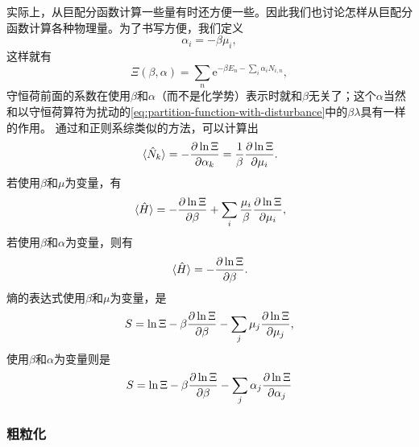 \documentclass[hyperref, UTF8, a4paper]{ctexart}
\newcommand*{\ee}{\mathrm{e}}
\begin{document}
实际上，从巨配分函数计算一些量有时还方便一些。因此我们也讨论怎样从巨配分函数计算各种物理量。为了书写方便，我们定义
\begin{equation}
    \alpha_i = - \beta \mu_i,
\end{equation}
这样就有
\begin{equation}
    \Xi(\beta, \alpha) = \sum_n \ee^{-\beta E_n - \sum_i \alpha_i N_{i,n}},
\end{equation}
守恒荷前面的系数在使用$\beta$和$\alpha$（而不是化学势）表示时就和$\beta$无关了；这个$\alpha$当然和以守恒荷算符为扰动的\eqref{eq:partition-function-with-disturbance}中的$\beta\lambda$具有一样的作用。
通过和正则系综类似的方法，可以计算出
\begin{equation}
    \expval*{\hat{N}_k} = - \pdv{\ln \Xi}{\alpha_k} = \frac{1}{\beta} \pdv{\ln \Xi}{\mu_i}.
    \label{eq:expectation-of-charge-grand}
\end{equation}
若使用$\beta$和$\mu$为变量，有
\begin{equation}
    \expval*{\hat{H}} = - \pdv{\ln \Xi}{\beta} + \sum_i \frac{\mu_i}{\beta} \pdv{\ln \Xi}{\mu_i},
\end{equation}
若使用$\beta$和$\alpha$为变量，则有
\begin{equation}
    \expval*{\hat{H}} = - \pdv{\ln \Xi}{\beta}.
    \label{eq:expactation-of-energy-grand}
\end{equation}
熵的表达式使用$\beta$和$\mu$为变量，是
\begin{equation}
    S = \ln \Xi - \beta \pdv{\ln \Xi}{\beta} - \sum_j \mu_j \pdv{\ln \Xi}{\mu_j},
    \label{eq:entropy-mu-beta}
\end{equation}
使用$\beta$和$\alpha$为变量则是
\begin{equation}
    S = \ln \Xi - \beta \pdv{\ln \Xi}{\beta} - \sum_j \alpha_j \pdv{\ln \Xi}{\alpha_j}
\end{equation}

\subsubsection{粗粒化}\label{sec:coarse-graining}

\end{document}
